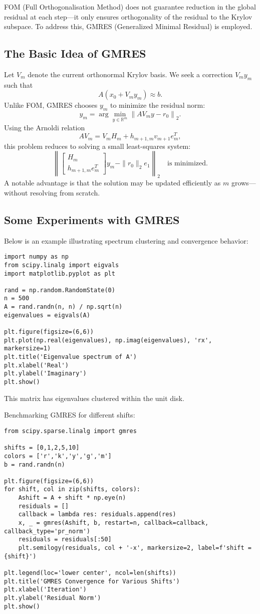 \documentclass[11pt,a4paper]{book}
\begin{document}
FOM (Full Orthogonalisation Method) does not guarantee reduction in the global residual at each step—it only ensures orthogonality of the residual to the Krylov subspace. To address this, GMRES (Generalized Minimal Residual) is employed.

\subsection*{The Basic Idea of GMRES}
Let \(V_m\) denote the current orthonormal Krylov basis. We seek a correction \(V_m y_m\) such that
\[
A \left( x_0 + V_m y_m \right) \approx b.
\]
Unlike FOM, GMRES chooses \(y_m\) to minimize the residual norm:
\[
y_m = \arg\min_{y \in \mathbb{R}^m} \left\| A V_m y - r_0 \right\|_2.
\]
Using the Arnoldi relation
\[
A V_m = V_m H_m + h_{m+1,m} v_{m+1} e_m^T,
\]
this problem reduces to solving a small least-squares system:
\[
\left\|
\begin{bmatrix}
H_m \\
h_{m+1,m} e_m^T
\end{bmatrix} y_m
- \|r_0\|_2 e_1
\right\|_2 \quad\text{is minimized.}
\]
A notable advantage is that the solution may be updated efficiently as \(m\) grows—without resolving from scratch.

\subsection*{Some Experiments with GMRES}
Below is an example illustrating spectrum clustering and convergence behavior:

\begin{lstlisting}
import numpy as np
from scipy.linalg import eigvals
import matplotlib.pyplot as plt

rand = np.random.RandomState(0)
n = 500
A = rand.randn(n, n) / np.sqrt(n)
eigenvalues = eigvals(A)

plt.figure(figsize=(6,6))
plt.plot(np.real(eigenvalues), np.imag(eigenvalues), 'rx', markersize=1)
plt.title('Eigenvalue spectrum of A')
plt.xlabel('Real')
plt.ylabel('Imaginary')
plt.show()
\end{lstlisting}

This matrix has eigenvalues clustered within the unit disk.

Benchmarking GMRES for different shifts:

\begin{lstlisting}
from scipy.sparse.linalg import gmres

shifts = [0,1,2,5,10]
colors = ['r','k','y','g','m']
b = rand.randn(n)

plt.figure(figsize=(6,6))
for shift, col in zip(shifts, colors):
    Ashift = A + shift * np.eye(n)
    residuals = []
    callback = lambda res: residuals.append(res)
    x, _ = gmres(Ashift, b, restart=n, callback=callback, callback_type='pr_norm')
    residuals = residuals[:50]
    plt.semilogy(residuals, col + '-x', markersize=2, label=f'shift = {shift}')

plt.legend(loc='lower center', ncol=len(shifts))
plt.title('GMRES Convergence for Various Shifts')
plt.xlabel('Iteration')
plt.ylabel('Residual Norm')
plt.show()
\end{lstlisting}
\end{document}
